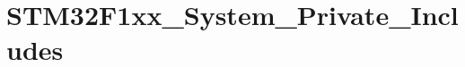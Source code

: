 \hypertarget{group___s_t_m32_f1xx___system___private___includes}{}\section{S\+T\+M32\+F1xx\+\_\+\+System\+\_\+\+Private\+\_\+\+Includes}
\label{group___s_t_m32_f1xx___system___private___includes}
